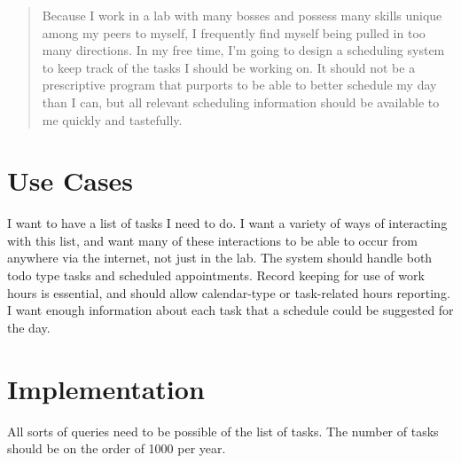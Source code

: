 \documentclass[12pt]{article}
\begin{document}
\maketitle

\begin{abstract}
Because I work in a lab with many bosses and possess many skills unique among my peers to myself,
I frequently find myself being pulled in too many directions.  In my free time, I'm going to
design a scheduling system to keep track of the tasks I should be working on.  It should not
be a prescriptive program that purports to be able to better schedule my day than I can, but
all relevant scheduling information should be available to me quickly and tastefully.
\end{abstract}

\section{Use Cases}
I want to have a list of tasks I need to do.  I want a variety of ways of interacting with this list,
and want many of these interactions to be able to occur from anywhere via the internet, not just in 
the lab.  The system should handle both todo type tasks and scheduled appointments.  Record keeping
for use of work hours is essential, and should allow calendar-type or task-related hours reporting.
I want enough information about each task that a schedule could be suggested for the day.

\section{Implementation}
All sorts of queries need to be possible of the list of tasks.  The number of tasks should be on the
order of 1000 per year.
\end{document}
